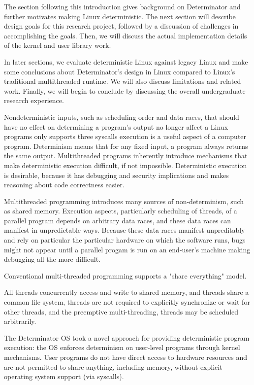 The section following this introduction gives background on Determinator and
further motivates making Linux deterministic. The next section will describe
design goals for this research project, followed by a discussion of challenges
in accomplishing the goals. Then, we will discuss the actual implementation
details of the kernel and user library work.

In later sections, we evaluate deterministic Linux against legacy Linux and
make some conclusions about Determinator's design in Linux compared to Linux's
traditional multithreaded runtime. We will also discuss limitations and related
work. Finally, we will begin to conclude by discussing the overall undergraduate
research experience.
\iffalse

Nondeterministic inputs, such as scheduling order and data
races, that should have no effect on determining a program's output no longer
affect a Linux programs 
only supports three syscalls
 execution is a useful aspect of a computer program. Determinism
means that for any fixed input, a program always returns the same output.
Multithreaded programs inherently introduce mechanisms that make deterministic
execution difficult, if not impossible. Deterministic execution is desirable,
because it has debugging and security implications and makes reasoning about
code correctness easier.

Multithreaded programming introduces many sources of non-determinism, such as
shared memory. Execution aspects, particularly scheduling of threads, of a
parallel program depends on arbitrary data races, and these data races can
manifest in unpredictable ways. Because these data races manifest unpreditably
and rely on particular the particular hardware on which the software runs, bugs
might not appear until a parallel progam is run on an end-user's machine making
debugging all the more difficult.

Conventional multi-threaded programming supports a "share everything" model.

All threads concurrently access and write to shared memory, and threads share a
common file system, threads are not required to explicitly synchronize or wait
for other threads, and the preemptive multi-threading, threads may be scheduled
arbitrarily.

The Determinator OS took a novel approach for providing deterministic program
execution: the OS enforces determinism on user-level programs through kernel
mechanisms. User programs do not have direct access to hardware resources and
are not permitted to share anything, including memory, without explicit
operating system support (via syscalls).

